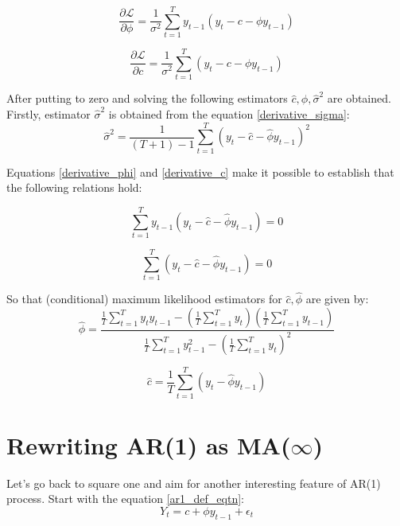 \documentclass[12pt]{article}
\begin{document}
\begin{equation}
\label{derivative_phi}
\frac{\partial \mathcal{L}}{\partial \phi} = 
\frac{1}{\sigma^2} \sum_{t = 1}^{T}  y_{t-1}(y_t - c -\phi y_{t-1})
\end{equation}

\begin{equation}
\label{derivative_c}
\frac{\partial \mathcal{L}}{\partial c} = 
\frac{1}{\sigma^2} \sum_{t = 1}^{T} (y_t - c -\phi y_{t-1})
\end{equation}

After putting to zero and solving the following estimators 
$ \hat{c}, \hat{\phi}, \hat{\sigma}^2 $ are obtained. Firstly, estimator $\hat{\sigma}^2$ 
is obtained from the equation \eqref{derivative_sigma}:
\begin{equation*}
\hat{\sigma}^2 = \frac{1}{(T+1) - 1} \sum_{t=1}^{T} 
(y_t - \hat{c} -\hat{\phi} y_{t-1})^2
\end{equation*}

Equations \eqref{derivative_phi} and \eqref{derivative_c} make it possible to establish 
that the following relations hold:

\begin{equation*}
\sum_{t=1}^{T} y_{t-1} (y_t - \hat{c} -\hat{\phi} y_{t-1}) = 0
\end{equation*}

\begin{equation*}
\sum_{t=1}^{T} (y_t - \hat{c} -\hat{\phi} y_{t-1}) = 0
\end{equation*}

So that (conditional) maximum likelihood estimators for $\hat{c}, \hat{\phi}$ are given 
by:
\begin{equation*}
\hat{\phi} = \frac{
	\frac{1}{T}\sum_{t=1}^T y_t y_{t-1} - (\frac{1}{T} \sum_{t=1}^T y_t)
	(\frac{1}{T} \sum_{t=1}^T y_{t-1})
}{
	\frac{1}{T}\sum_{t=1}^T y_{t-1}^2 - (\frac{1}{T} \sum_{t=1}^T y_t)^2
}
\end{equation*}

\begin{equation*}
\hat{c} = \frac{1}{T} \sum_{t=1}^T (y_t - \hat{\phi} y_{t-1})
\end{equation*}


\section{Rewriting AR(1) as MA($\infty$)}
Let's go back to square one and aim for another interesting feature of AR(1) process.
Start with the equation \eqref{ar1_def_eqtn}:
\begin{equation*}
Y_t = c + \phi y_{t-1} + \epsilon_t
\end{equation*}
\end{document}
